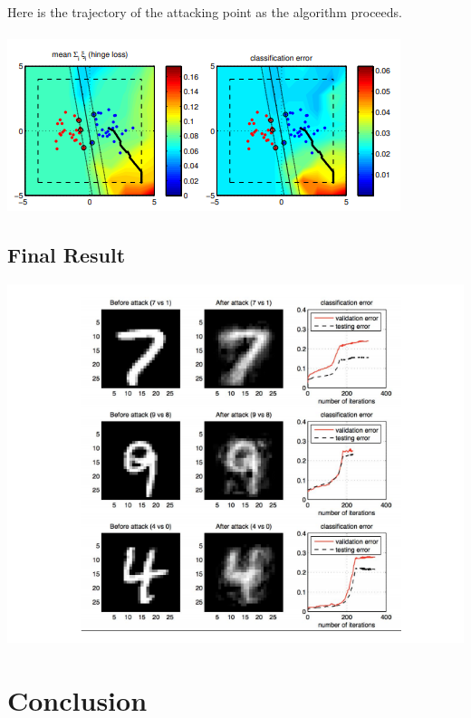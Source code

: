 \documentclass{article}
\begin{document}
\paragraph{}
Here is the trajectory of the attacking point as the algorithm proceeds. 
\paragraph{}
\includegraphics[scale=1]{poisontrajectory.PNG}
\subsection{Final Result}
\includegraphics[scale=1]{finalResult.PNG}

\section*{Conclusion}
\end{document}
